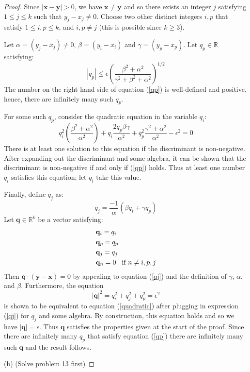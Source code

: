 \documentclass[12pt]{article}
\begin{document}
\begin{proof}
Since $|\mathbf{x} - \mathbf{y} | > 0$, we have $\mathbf{x} \neq \mathbf{y}$ and so there exists an integer $j$ satisfying $1\leq j \leq k$ such that $y_j - x_j \neq 0$.  Choose two other distinct integers $i, p$ that satisfy $1 \leq i,p \leq k$, and $i,p \neq j$ (this is possible since $k\geq 3$).\par
Let $\alpha = (y_j - x_j) \neq 0$, $\beta = (y_i - x_i)$ and $\gamma = (y_p - x_p)$.  Let $q_p\in \mathbb{R}$ satisfying:
\begin{equation}\label{qp}
|q_p| \leq \epsilon \left( \frac{\beta^2 + \alpha^2}{\gamma^2 + \beta^2 + \alpha^2}\right)^{1/2}
\end{equation}
The number on the right hand side of equation (\ref{qp}) is well-defined and positive, hence, there are infinitely many such $q_p$.\par
For some such $q_p$, consider the quadratic equation in the variable $q_i$:
\begin{equation}\label{quadratic}
q_i^2\left(\frac{\beta^2 + \alpha^2}{\alpha^2}\right) + q_i\frac{2q_p\beta\gamma}{\alpha^2} + q_p^2\frac{\gamma^2 + \alpha^2}{\alpha^2} - \epsilon^2 = 0
\end{equation}
There is at least one solution to this equation if the discriminant is non-negative.  After expanding out the discriminant and some algebra, it can be shown that the discriminant is non-negative if and only if (\ref{qp}) holds.  Thus at least one number $q_i$ satisfies this equation; let $q_i$ take this value. \par
Finally, define $q_j$ as:
\begin{equation}\label{qj}
 q_j = \frac{-1}{\alpha}(\beta q_i + \gamma q_p)  
 \end{equation}
 Let $\mathbf{q} \in \mathbb{R}^k$ be a vector satisfying:
\begin{align}
&\mathbf{q}_i = q_i \\
&\mathbf{q}_p = q_p \\
&\mathbf{q}_j = q_j \\
&\mathbf{q}_n = 0 \hspace{3mm} \text{if} \ n\neq i,p,j
\end{align}
Then $\mathbf{q} \cdot (\mathbf{y} - \mathbf{x}) = 0$ by appealing to equation (\ref{qj}) and the definition of $\gamma$, $\alpha$, and $\beta$.  Furthermore, the equation
\begin{equation}
|\mathbf{q}|^2 = q_i^2 + q_j^2 + q_p^2 = \epsilon^2
\end{equation}
is shown to be equivalent to equation (\ref{quadratic}) after plugging in expression (\ref{qj}) for $q_j$ and some algebra.  By construction, this equation holds and so we have $|\mathbf{q}| = \epsilon$.  Thus $\mathbf{q}$ satisfies the properties given at the start of the proof.  Since there are infinitely many $q_p$ that satisfy equation (\ref{qp}) there are infinitely many such $\mathbf{q}$ and the result follows.

\vspace{5mm}

(b) (Solve problem 13 first)


\end{proof}
\end{document}
